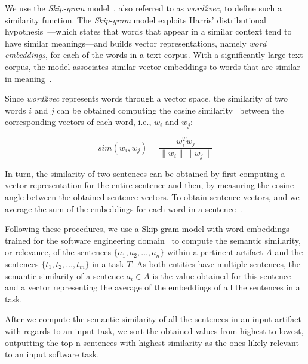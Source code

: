 



We use the \textit{Skip-gram} model~\cite{Mikolov2013}, also referred to as \textit{word2vec}, to define such a similarity function.
The \textit{Skip-gram} model exploits Harris' distributional hypothesis~\cite{harris1954distributional}---which states that words that appear in a similar context tend to have similar meanings---and builds vector representations, namely \textit{word embeddings}, for each of the words in a text corpus.
With a significantly large text corpus, the model associates similar vector embeddings to words that are similar in meaning~\cite{Ye2016}.


Since \textit{word2vec} represents words through a vector space, the similarity of two words $i$ and $j$ can be obtained computing the cosine similarity~\cite{Manning2009IR} between the corresponding vectors of each word, i.e., $w_i$ and $w_j$:

\begin{equation}
    sim(w_i,w_j) = \frac{w_i^Tw_j}{\|w_i\| \|w_j\|}
    \label{eq:word-sim}
\end{equation}
 
\smallskip
In turn, the similarity of two sentences can be obtained  by first computing a vector representation for the entire sentence and then, by measuring the cosine angle between the obtained sentence vectors.
To obtain sentence vectors,  and 
 we average the sum of the embeddings for each word in a sentence~\cite{conneau2018}.




Following these procedures, we use a Skip-gram model with word embeddings trained for the software engineering domain~\cite{Efstathiou2018} to compute the semantic similarity, or relevance, of the sentences $\{a_1, a_2, \dots, a_n\}$ within a pertinent artifact $A$ and the sentences $\{t_1, t_2, \dots, t_m\}$ in a task  $T$. As both entities have multiple sentences, the semantic similarity of a sentence $a_i \in A$ is the value obtained for this sentence and 
a vector representing the average of the embeddings of all the sentences in a task.


After we compute the semantic similarity of all the sentences in an input artifact with regards to an input task, we sort the obtained values from highest to lowest, outputting the top-n sentences with highest similarity as the ones likely relevant to an input software task.


